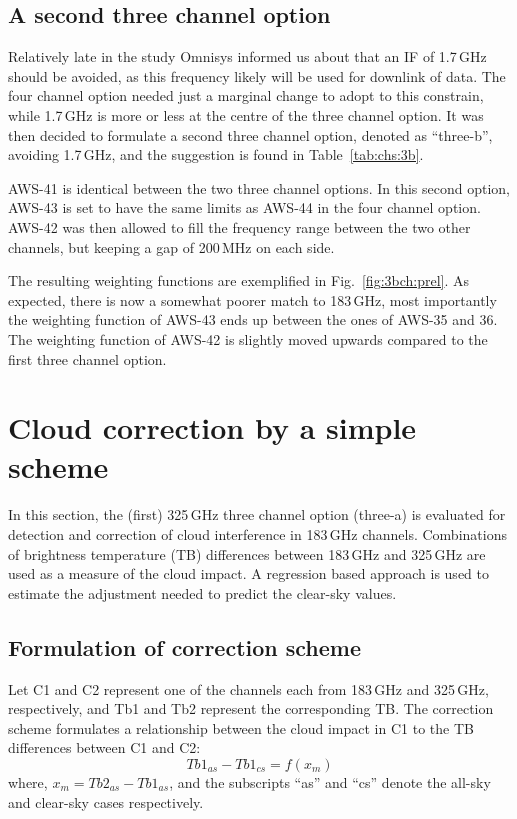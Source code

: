 \documentclass[12pt]{article}
\begin{document}
\subsection{A second three channel option}
%
Relatively late in the study Omnisys informed us about that an IF of 1.7\,GHz
should be avoided, as this frequency likely will be used for downlink of data.
The four channel option needed just a marginal change to adopt to this
constrain, while 1.7\,GHz is more or less at the centre of the three channel
option. It was then decided to formulate a second three channel option, denoted as ``three-b'', avoiding 1.7\,GHz, and the suggestion is found in Table~\ref{tab:chs:3b}.

AWS-41 is identical between the two three channel options. In this second
option, AWS-43 is set to have the same limits as AWS-44 in the four channel
option. AWS-42 was then allowed to fill the frequency range between the two
other channels, but keeping a gap of 200\,MHz on each side.

The resulting weighting functions are exemplified in Fig.~\ref{fig:3bch:prel}.
As expected, there is now a somewhat poorer match to 183\,GHz, most importantly
the weighting function of AWS-43 ends up between the ones of AWS-35 and 36. The
weighting function of AWS-42 is slightly moved upwards compared to the first
three channel option.



\section{Cloud correction by a simple scheme}
\label{sec:simple}
%
In this section, the (first) 325\,GHz three channel option (three-a) is evaluated for detection
and correction of cloud interference in 183\,GHz channels. Combinations of
brightness temperature (TB) differences between 183\,GHz and 325\,GHz are used
as a measure of the cloud impact. A regression based approach is used to
estimate the adjustment needed to predict the clear-sky values.




\subsection{Formulation of correction scheme}
\label{sec:correction:scheme}
%
Let C1 and C2 represent one of the channels each from 183\,GHz and 325\,GHz,
respectively, and Tb1 and Tb2 represent the corresponding TB. The correction
scheme formulates a relationship between the cloud impact in C1 to the TB
differences between C1 and C2:
\begin{equation}
Tb1_{as}-Tb1_{cs} = f(x_m)
\label{eq:TB:diff}
\end{equation}
where, $x_m = Tb2_{as} - Tb1_{as}$, and the subscripts ``as'' and ``cs'' denote the all-sky and clear-sky cases respectively.  
\end{document}
